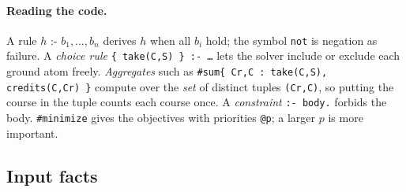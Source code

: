 \documentclass[10pt,a4paper]{article}
\begin{document}
\paragraph{Reading the code.}
A rule $h \texttt{ :- } b_1,\dots,b_n$ derives $h$ when all $b_i$ hold; the
symbol \texttt{not} is negation as failure. A \emph{choice rule}
\texttt{\{ take(C,S) \} :- \dots} lets the solver include or exclude each
ground atom freely. \emph{Aggregates} such as
\texttt{\#sum\{ Cr,C : take(C,S), credits(C,Cr) \}} compute over the
\emph{set} of distinct tuples \texttt{(Cr,C)}, so putting the course in the
tuple counts each course once. A \emph{constraint} \texttt{:- body.} forbids
the body. \texttt{\#minimize} gives the objectives with priorities
\texttt{@p}; a larger $p$ is more important.
 
\subsection{Input facts}
\label{sec:asp-input}
 
\end{document}
